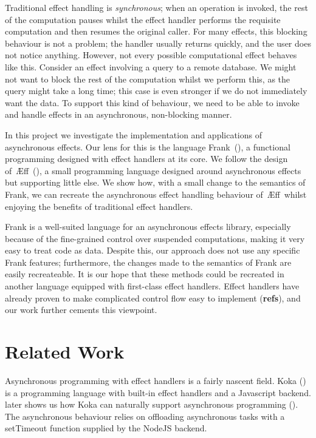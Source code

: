 \documentclass[msc,deptreport,cs]{infthesis} %
\newcommand\aeff{{\AE}ff\xspace}
\begin{document}
Traditional effect handling is \emph{synchronous}; when an operation is invoked,
the rest of the computation pauses whilst the effect handler performs the
requisite computation and then resumes the original caller.
%
For many effects, this blocking behaviour is not a problem; the handler usually
returns quickly, and the user does not notice anything. However, not every
possible computational effect behaves like this. Consider an effect involving a
query to a remote database. We might not want to block the rest of the
computation whilst we perform this, as the query might take a long time; this
case is even stronger if we do not immediately want the data. To support this
kind of behaviour, we need to be able to invoke and handle effects in an
asynchronous, non-blocking manner.

In this project we investigate the implementation and applications of
asynchronous effects. Our lens for this is the language
Frank~(\cite{convent2020doo}), a functional programming designed with effect
handlers at its core. We follow the design
of~\aeff~(\cite{ahman2020asynchronous}), a small programming language designed
around asynchronous effects but supporting little else. We show how, with a
small change to the semantics of Frank, we can recreate the asynchronous effect
handling behaviour of~\aeff~whilst enjoying the benefits of traditional effect
handlers.

Frank is a well-suited language for an asynchronous effects library, especially
because of the fine-grained control over suspended computations, making it very
easy to treat code as data. Despite this, our approach does not use any specific
Frank features; furthermore, the changes made to the semantics of Frank are
easily recreateable. It is our hope that these methods could be recreated in
another language equipped with first-class effect handlers. Effect handlers have
already proven to make complicated control flow easy to implement
(\textbf{refs}), and our work further cements this viewpoint.

\section{Related Work}

Asynchronous programming with effect handlers is a fairly nascent field.
%
Koka (\cite{leijen2014koka}) is a programming language with built-in effect
handlers and a Javascript backend. \citeauthor{leijen2017structured} later shows
us how Koka can naturally support asynchronous programming
(\cite{leijen2017structured}). The asynchronous behaviour relies on offloading
asynchronous tasks with a \textsf{setTimeout} function supplied by the NodeJS
backend.
\end{document}
